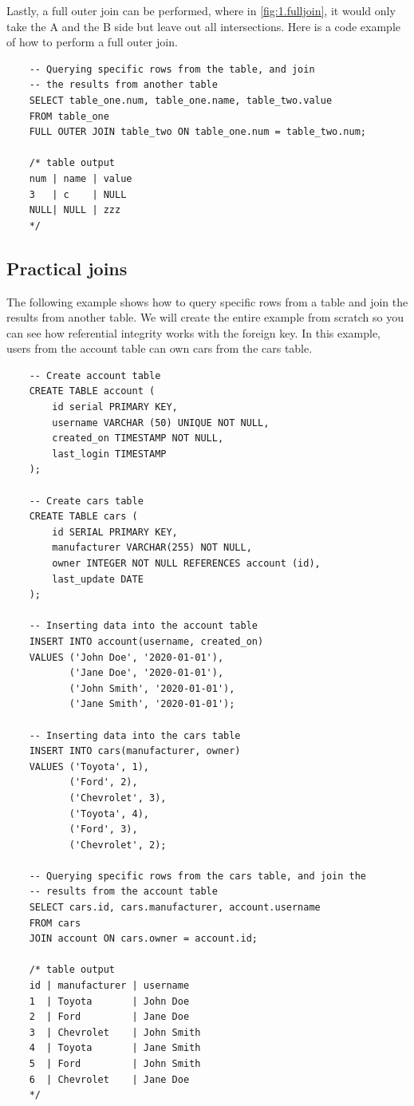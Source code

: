 Lastly, a full outer join can be performed, where in \cref{fig:1.fulljoin}, it would only take the A and the B side but leave out all intersections. Here is a code example of how to perform a full outer join.

\begin{verbatim}
    -- Querying specific rows from the table, and join 
    -- the results from another table
    SELECT table_one.num, table_one.name, table_two.value
    FROM table_one
    FULL OUTER JOIN table_two ON table_one.num = table_two.num;

    /* table output
    num | name | value
    3   | c    | NULL
    NULL| NULL | zzz
    */
\end{verbatim}

\subsection{Practical joins}

The following example shows how to query specific rows from a table and join the results from another table. We will create the entire example from scratch so you can see how referential integrity works with the foreign key. In this example, users from the account table can own cars from the cars table.

\begin{verbatim}
    -- Create account table
    CREATE TABLE account (
        id serial PRIMARY KEY,
        username VARCHAR (50) UNIQUE NOT NULL,
        created_on TIMESTAMP NOT NULL, 
        last_login TIMESTAMP
    );

    -- Create cars table
    CREATE TABLE cars (
        id SERIAL PRIMARY KEY,
        manufacturer VARCHAR(255) NOT NULL,
        owner INTEGER NOT NULL REFERENCES account (id),
        last_update DATE
    );

    -- Inserting data into the account table
    INSERT INTO account(username, created_on)
    VALUES ('John Doe', '2020-01-01'),
           ('Jane Doe', '2020-01-01'),
           ('John Smith', '2020-01-01'),
           ('Jane Smith', '2020-01-01');

    -- Inserting data into the cars table
    INSERT INTO cars(manufacturer, owner)
    VALUES ('Toyota', 1),
           ('Ford', 2),
           ('Chevrolet', 3),
           ('Toyota', 4),
           ('Ford', 3),
           ('Chevrolet', 2);

    -- Querying specific rows from the cars table, and join the 
    -- results from the account table
    SELECT cars.id, cars.manufacturer, account.username
    FROM cars
    JOIN account ON cars.owner = account.id;

    /* table output
    id | manufacturer | username
    1  | Toyota       | John Doe
    2  | Ford         | Jane Doe
    3  | Chevrolet    | John Smith
    4  | Toyota       | Jane Smith
    5  | Ford         | John Smith
    6  | Chevrolet    | Jane Doe
    */
\end{verbatim}


